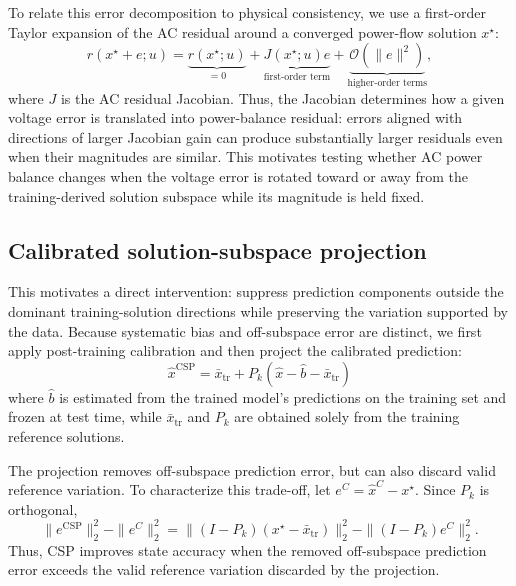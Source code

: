 \documentclass{article}
\begin{document}
To relate this error decomposition to physical consistency, we use a
first-order Taylor expansion of the AC residual around a converged
power-flow solution $x^\star$:
\begin{equation}
    r(x^\star+e;u)
    =
    \underbrace{r(x^\star;u)}_{=0}
    +
    \underbrace{J(x^\star;u)e}_{\text{first-order term}}
    +
    \underbrace{\mathcal{O}(\|e\|^2)}_{\text{higher-order terms}},
    \label{eq:local_residual}
\end{equation}
where $J$ is the AC residual Jacobian.
Thus, the Jacobian determines how a given voltage error is translated
into power-balance residual: errors aligned with directions of larger
Jacobian gain can produce substantially larger residuals even when their
magnitudes are similar.
This motivates testing whether AC power balance changes when the voltage
error is rotated toward or away from the training-derived solution
subspace while its magnitude is held fixed.

\subsection{Calibrated solution-subspace projection}

This motivates a direct intervention: suppress prediction components
outside the dominant training-solution directions while preserving the
variation supported by the data. Because systematic bias and off-subspace
error are distinct, we first apply post-training calibration and then
project the calibrated prediction:
\begin{equation}
    \boxed{
    \hat x^{\mathrm{CSP}}
    =
    \bar x_{\mathrm{tr}}
    +
    P_k
    \left(
        \hat x-\hat b-\bar x_{\mathrm{tr}}
    \right)
    }
    \label{eq:csp}
\end{equation}
where $\hat b$ is estimated from the trained model's predictions on the
training set and frozen at test time, while $\bar x_{\mathrm{tr}}$ and
$P_k$ are obtained solely from the training reference solutions.

The projection removes off-subspace prediction error, but can also discard
valid reference variation. To characterize this trade-off, let $e^C=\hat x^C-x^\star$. Since $P_k$ is orthogonal,
\begin{equation}
\|e^{\mathrm{CSP}}\|_2^2-\|e^C\|_2^2
=
\|(I-P_k)(x^\star-\bar x_{\mathrm{tr}})\|_2^2
-\|(I-P_k)e^C\|_2^2 .
\label{eq:tradeoff}
\end{equation}
Thus, CSP improves state accuracy when the removed off-subspace prediction
error exceeds the valid reference variation discarded by the projection.
\end{document}
